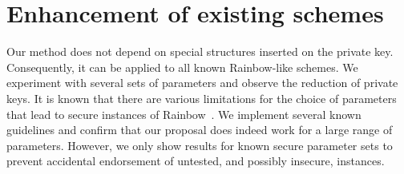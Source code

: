 \documentclass[draft, 12pt, a4paper, oneside]{memoir}
\theoremstyle{definition}
\begin{document}
\section{Enhancement of existing schemes}\label{sec:experiments}

Our method does not depend on special structures inserted on the private key.
Consequently, it can be applied to all known Rainbow-like schemes. We
experiment with several sets of parameters and observe the reduction of private
keys. It is known that there are various limitations for the choice of
parameters that lead to secure instances of
Rainbow~\cite{Petzoldt:201005}. We implement several known guidelines
and confirm that our proposal does indeed work for a large range of parameters.
However, we only show results for known secure parameter sets to prevent
accidental endorsement of untested, and possibly insecure, instances.
\end{document}
